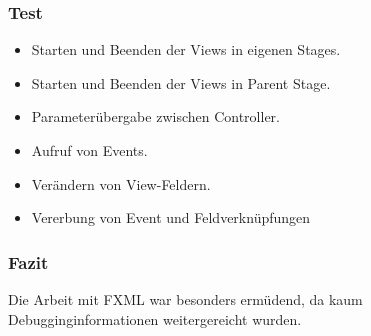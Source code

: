 \subsubsection{Test}
\begin{itemize}
	\item Starten und Beenden der Views in eigenen Stages.
	\item Starten und Beenden der Views in Parent Stage.
	\item Parameterübergabe zwischen Controller.
	\item Aufruf von Events.
	\item Verändern von View-Feldern.
	\item Vererbung von Event und Feldverknüpfungen
\end{itemize}

\subsubsection{Fazit}
Die Arbeit mit FXML war besonders ermüdend, da kaum Debugginginformationen weitergereicht wurden.